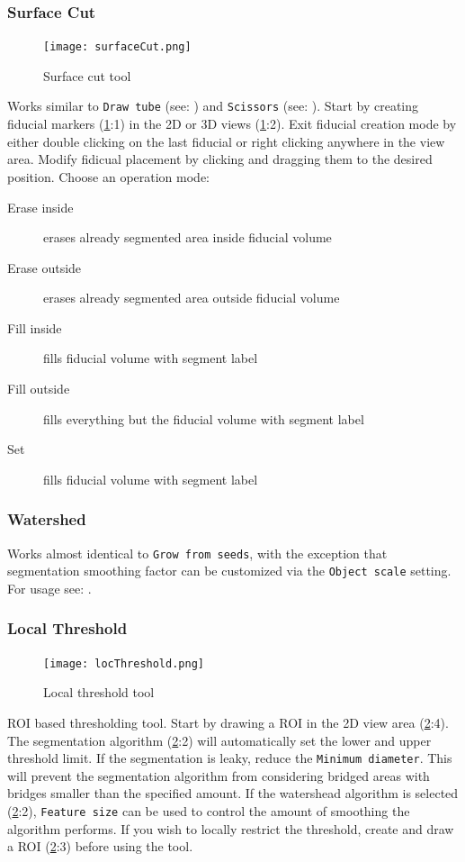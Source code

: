 \subsubsection{Surface Cut}
\begin{figure}[h!]
	\centerline{
		\texttt{[image: surfaceCut.png]}}
	\caption{Surface cut tool}\label{fig:sc}
\end{figure}
\noindent
Works similar to \texttt{Draw tube} (see: ) and \texttt{Scissors} (see: ).
Start by creating fiducial markers (\cref{fig:sc}:1) in the 2D or 3D views (\cref{fig:sc}:2).
Exit fiducial creation mode by either double clicking on the last fiducial or right clicking anywhere in the view area.
Modify fidicual placement by clicking and dragging them to the desired position.
Choose an operation mode:
\begin{description}
	\item [Erase inside] erases already segmented area inside fiducial volume
	\item [Erase outside] erases already segmented area outside fiducial volume
	\item [Fill inside] fills fiducial volume with segment label
	\item [Fill outside] fills everything but the fiducial volume with segment label
	\item [Set] fills fiducial volume with segment label
\end{description}

\pagebreak
\subsubsection{Watershed}
Works almost identical to \texttt{Grow from seeds}, with the exception that segmentation smoothing factor can be customized via the \texttt{Object scale} setting.
For usage see: .

\pagebreak
\subsubsection{Local Threshold}
\begin{figure}[h!]
	\centerline{
		\texttt{[image: locThreshold.png]}}
	\caption{Local threshold tool}\label{fig:lt}
\end{figure}
\noindent
ROI based thresholding tool.
Start by drawing a ROI in the 2D view area (\cref{fig:lt}:4).
The segmentation algorithm (\cref{fig:lt}:2) will automatically set the lower and upper threshold limit.
If the segmentation is leaky, reduce the \texttt{Minimum diameter}.
This will prevent the segmentation algorithm from considering bridged areas with bridges smaller than the specified amount.
If the watershead algorithm is selected (\cref{fig:lt}:2), \texttt{Feature size} can be used to control the amount of smoothing the algorithm performs.
If you wish to locally restrict the threshold, create and draw a ROI (\cref{fig:lt}:3) before using the tool.

